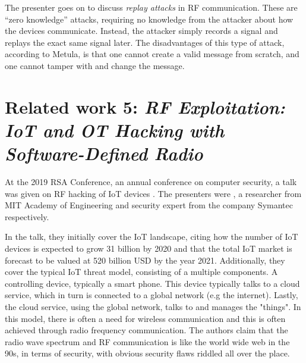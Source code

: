 The presenter goes on to discuss \textit{replay attacks} in RF communication. These are \enquote{zero knowledge} attacks, requiring no knowledge from the attacker about how the devices communicate. Instead, the attacker simply records a signal and replays the exact same signal later. The disadvantages of this type of attack, according to Metula, is that one cannot create a valid message from scratch, and one cannot tamper with and change the message.

\section{Related work 5: \textit{RF Exploitation: IoT and OT Hacking with Software-Defined Radio}}
At the 2019 RSA Conference, an annual conference on computer security, a talk was given on RF hacking of IoT devices \cite{rf-exploitation-talk}. The presenters were \citeauthor{rf-exploitation-talk}, a researcher from MIT Academy of Engineering and security expert from the company Symantec respectively.

In the talk, they initially cover the IoT landscape, citing how the number of IoT devices is expected to grow 31 billion by 2020 and that the total IoT market is forecast to be valued at 520 billion USD by the year 2021. Additionally, they cover the typical IoT threat model, consisting of a multiple components. A controlling device, typically a smart phone. This device typically talks to a cloud service, which in turn is connected to a global network (e.g the internet). Lastly, the cloud service, using the global network, talks to and manages the "things". In this model, there is often a need for wireless communication and this is often achieved through radio frequency communication. The authors claim that the radio wave spectrum and RF communication is like the world wide web in the 90s, in terms of security, with obvious security flaws riddled all over the place.

